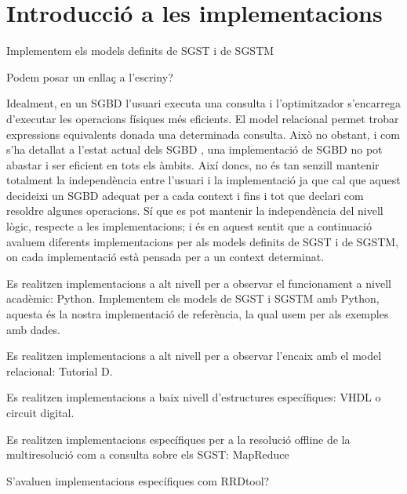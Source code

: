 

\chapter{Introducció a les implementacions}


Implementem els models definits de \gls{SGST} i de \gls{SGSTM}


Podem posar un enllaç a l'escriny? 

Idealment, en un \gls{SGBD} l'usuari executa una consulta i
l'optimitzador s'encarrega d'executar les operacions físiques més
eficients. El model relacional permet trobar expressions equivalents
donada una determinada consulta. Això no obstant, i com s'ha detallat
a l'estat actual dels \gls{SGBD} , una implementació de
\gls{SGBD} no pot abastar i ser eficient en tots els àmbits. Així
doncs, no és tan senzill mantenir totalment la independència entre
l'usuari i la implementació ja que cal que aquest decideixi un
\gls{SGBD} adequat per a cada context i fins i tot que declari com
resoldre algunes operacions. Sí que es pot mantenir la independència
del nivell lògic, respecte a les implementacions; i és en aquest
sentit que a continuació avaluem diferents implementacions per als
models definits de \gls{SGST} i de \gls{SGSTM}, on cada implementació
està pensada per a un context determinat.





Es realitzen implementacions a alt nivell per a observar el funcionament a nivell acadèmic: Python. Implementem els models de \gls{SGST} i \gls{SGSTM} amb Python, aquesta és la nostra implementació de referència, la qual usem per als exemples amb dades.

Es realitzen implementacions a alt nivell per a observar l'encaix amb el model relacional: Tutorial D.

Es realitzen implementacions a baix nivell d'estructures específiques: VHDL o circuit digital.


Es realitzen implementacions específiques per a la resolució offline de la multiresolució com a consulta sobre els \gls{SGST}: MapReduce


S'avaluen implementacions específiques com RRDtool?




